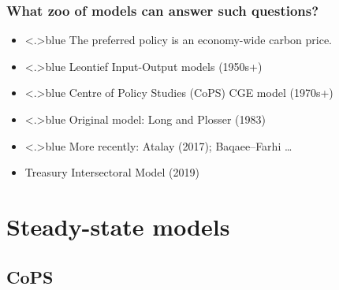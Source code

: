 \documentclass[handout,english]{beamer}
\begin{document}
\begin{frame}
\frametitle{What zoo of models can answer such questions?}
\begin{itemize}
\item<+-|alert@+>{\color<.>{blue}
  The preferred policy is an economy-wide carbon price.
        }
\end{itemize}
      \begin{itemize}
\item<+-|alert@+>{\color<.>{blue}
        Leontief Input-Output models (1950s+)
        }
\item<+-|alert@+>{\color<.>{blue}
        Centre of Policy Studies (CoPS) CGE model (1970s+)
              }
      \end{itemize}
      \begin{itemize}
        \item<+-|alert@+>{\color<.>{blue}
          Original model: Long and Plosser (1983)
        }
        \item<+-|alert@+>{\color<.>{blue}
        More recently: Atalay (2017); Baqaee--Farhi \dots
        }
        \item<+-|alert@+>{\color{red}
        Treasury Intersectoral Model (2019)
        }
      \end{itemize}
      \vfill\end{frame}
\section{Steady-state models}
\subsection{CoPS}
\end{document}
